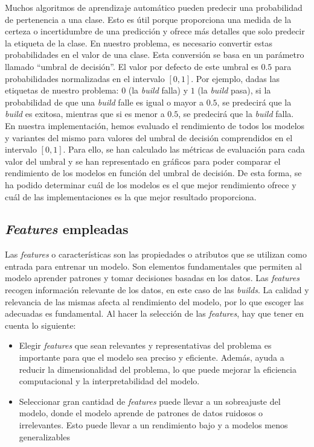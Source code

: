 Muchos algoritmos de aprendizaje automático pueden predecir una probabilidad de
pertenencia a una clase. Esto es útil porque proporciona una medida de la certeza o incertidumbre
de una predicción y ofrece más detalles que solo predecir la etiqueta de la clase. En nuestro
problema, es necesario convertir estas probabilidades en el valor de una clase. Esta conversión
se basa en un parámetro llamado ``umbral de decisión''. El valor por defecto de este umbral
es $0.5$ para probabilidades normalizadas en el intervalo $[0, 1]$. Por ejemplo, dadas las
etiquetas de nuestro problema: $0$ (la \textit{build} falla) y $1$ (la \textit{build} pasa), si
la probabilidad de que una \textit{build} falle es igual o mayor a $0.5$, se predecirá que la
\textit{build} es exitosa, mientras que si es menor a $0.5$, se predecirá que la \textit{build}
falla.\\

En nuestra implementación, hemos evaluado el rendimiento de todos los modelos y variantes del
mismo para valores del umbral de decisión comprendidos en el intervalo $[0, 1]$. Para ello, se
han calculado las métricas de evaluación para cada valor del umbral y se han representado en
gráficos para poder comparar el rendimiento de los modelos en función del umbral de decisión. De
esta forma, se ha podido determinar cuál de los modelos es el que mejor rendimiento ofrece y cuál
de las implementaciones es la que mejor resultado proporciona.


\subsection{\textit{Features} empleadas}
Las \textit{features} o características son las propiedades o atributos que se utilizan como entrada
para entrenar un modelo. Son elementos fundamentales que permiten al modelo aprender patrones y
tomar decisiones basadas en los datos. Las \textit{features} recogen información relevante de
los datos, en este caso de las \textit{builds}. La calidad y relevancia de las mismas afecta
al rendimiento del modelo, por lo que escoger las adecuadas es fundamental. Al hacer la selección
de las \textit{features}, hay que tener en cuenta lo siguiente:

\begin{itemize}
    \item Elegir \textit{features} que sean relevantes y representativas del problema es importante
    para que el modelo sea preciso y eficiente. Además, ayuda a reducir la dimensionalidad
    del problema, lo que puede mejorar la eficiencia computacional y la interpretabilidad del
    modelo.\\
    \item Seleccionar gran cantidad de \textit{features} puede llevar a un sobreajuste del modelo,
    donde el modelo aprende de patrones de datos ruidosos o irrelevantes. Esto puede llevar a un
    rendimiento bajo y a modelos menos generalizables
\end{itemize}

